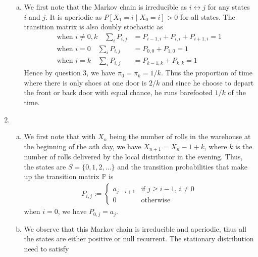 \documentclass[a4paper,10pt]{article}
\theoremstyle{definition}
\begin{document}
\begin{enumerate}
\begin{enumerate}[(a)]
\item We first note that the Markov chain is irreducible as $i\leftrightarrow j$ for any states $i$ and $j$. It is aperiodic as $P\left[X_1=i\mid X_0=i\right] >0$ for all states. The transition matrix is also doubly stochastic as 
\begin{align*}
\text{when $i \neq 0,k$} \quad\sum_{i}P_{i,j}&=P_{i-1,i}+P_{i,i}+P_{i+1,i}=1  \\
\text{when $i = 0$} \quad \sum_{i}P_{i,j}&=P_{0,0}+P_{1,0}=1  \\
\text{when $i = k$} \quad\sum_{i}P_{i,j}&=P_{k-1,k}+P_{k,k}=1 
\end{align*}
Hence by question 3, we have $\pi_0=\pi_k=1/k$. Thus the proportion of time where there is only shoes at one door is $2/k$ and since he choose to depart the front or back door with equal chance, he runs barefooted $1/k$ of the time.
\end{enumerate}
\item
\begin{enumerate}[(a)]
\item We first note that with $X_n$ being the number of rolls in the warehouse at the beginning of the $n$th day, we have $X_{n+1}=X_n-1+k$, where $k$ is the number of rolls delivered by the local distributor in the evening. Thus, the states are $S=\{0,1,2,\ldots\}$ and the transition probabilities that make up the transition matrix $\mathbb{P}$ is
\begin{align*}
P_{i,j}:=\begin{cases}
a_{j-i+1} & \text{if $j\geq i-1$, $i\neq 0$}\\
0 & \text{otherwise}
\end{cases}
\end{align*}
when $i=0$, we have $P_{0,j}=a_j$.
\item We observe that this Markov chain is irreducible and aperiodic, thus all the states are either positive or null recurrent. The stationary distribution need to satisfy

\end{enumerate}
\end{enumerate}
\end{document}
